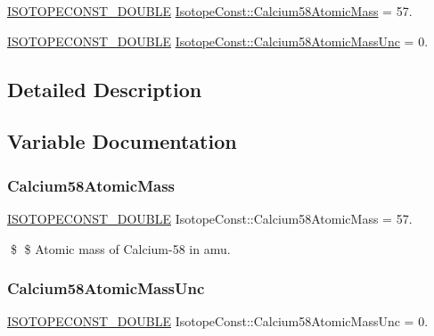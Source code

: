 \begin{DoxyCompactItemize}
\item 
\mbox{\hyperlink{group___isotope_const-_macros_ga8f45a7272ce02c0b4c65c44636ed719a}{I\+S\+O\+T\+O\+P\+E\+C\+O\+N\+S\+T\+\_\+\+D\+O\+U\+B\+LE}} \mbox{\hyperlink{group___isotope_const-_calcium-_ca58_gab8e68e43e014a4ce4049e315d2b40779}{Isotope\+Const\+::\+Calcium58\+Atomic\+Mass}} = 57.
\item 
\mbox{\hyperlink{group___isotope_const-_macros_ga8f45a7272ce02c0b4c65c44636ed719a}{I\+S\+O\+T\+O\+P\+E\+C\+O\+N\+S\+T\+\_\+\+D\+O\+U\+B\+LE}} \mbox{\hyperlink{group___isotope_const-_calcium-_ca58_ga20edcf6db9dd7fb048c4bff19d83a6f4}{Isotope\+Const\+::\+Calcium58\+Atomic\+Mass\+Unc}} = 0.
\end{DoxyCompactItemize}


\subsection{Detailed Description}


\subsection{Variable Documentation}
\mbox{\label{group___isotope_const-_calcium-_ca58_gab8e68e43e014a4ce4049e315d2b40779}} 
\subsubsection{\texorpdfstring{Calcium58\+Atomic\+Mass}{Calcium58AtomicMass}}
{\footnotesize\ttfamily \mbox{\hyperlink{group___isotope_const-_macros_ga8f45a7272ce02c0b4c65c44636ed719a}{I\+S\+O\+T\+O\+P\+E\+C\+O\+N\+S\+T\+\_\+\+D\+O\+U\+B\+LE}} Isotope\+Const\+::\+Calcium58\+Atomic\+Mass = 57.}

\$ \$ Atomic mass of Calcium-\/58 in amu. \mbox{\label{group___isotope_const-_calcium-_ca58_ga20edcf6db9dd7fb048c4bff19d83a6f4}} 
\subsubsection{\texorpdfstring{Calcium58\+Atomic\+Mass\+Unc}{Calcium58AtomicMassUnc}}
{\footnotesize\ttfamily \mbox{\hyperlink{group___isotope_const-_macros_ga8f45a7272ce02c0b4c65c44636ed719a}{I\+S\+O\+T\+O\+P\+E\+C\+O\+N\+S\+T\+\_\+\+D\+O\+U\+B\+LE}} Isotope\+Const\+::\+Calcium58\+Atomic\+Mass\+Unc = 0.}

